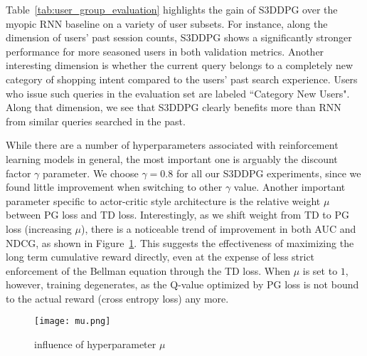 Table~\ref{tab:user_group_evaluation} highlights the gain of S3DDPG over the myopic RNN baseline on a variety of user subsets. For instance, along the dimension of users' past session counts, S3DDPG shows a significantly stronger performance for more seasoned users in both validation metrics. Another interesting dimension is whether the current query belongs to a completely new category of shopping intent compared to the users' past search experience. Users who issue such queries in the evaluation set are labeled ``Category New Users". Along that dimension, we see that S3DDPG clearly benefits more than RNN from similar queries searched in the past.

While there are a number of hyperparameters associated with reinforcement learning models in general, the most important one is arguably the discount factor $\gamma$ parameter. We choose $\gamma = 0.8$ for all our S3DDPG experiments, since we found little improvement when switching to other $\gamma$ value. Another important parameter specific to actor-critic style architecture is the relative weight $\mu$ between PG loss and TD loss. Interestingly, as we shift weight from TD to PG loss (increasing $\mu$), there is a noticeable trend of improvement in both AUC and NDCG, as shown in Figure~\ref{fig:hyperparameter}. This suggests the effectiveness of maximizing the long term cumulative reward directly, even at the expense of less strict enforcement of the Bellman equation through the TD loss. When $\mu$ is set to $1$, however, training degenerates, as the Q-value optimized by PG loss is not bound to the actual reward (cross entropy loss) any more.

\begin{figure}
    \centering
    \texttt{[image: mu.png]}
    \caption{influence of hyperparameter $\mu$}
    \label{fig:hyperparameter}
\end{figure}

